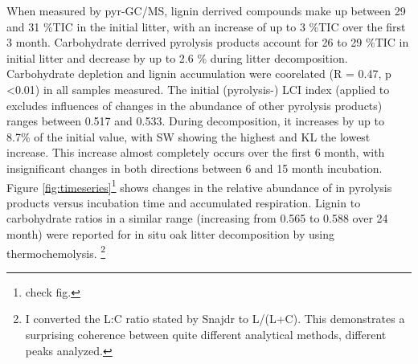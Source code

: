 \documentclass[10pt]{article}
\begin{document}
When measured by pyr-GC/MS, lignin derrived compounds make up between 29 and 31 \%TIC in the initial litter, with an increase of up to 3 \%TIC over the first 3 month. Carbohydrate derrived pyrolysis products account for 26 to 29 \%TIC in initial litter and decrease by up to 2.6 \% during litter decomposition. Carbohydrate depletion and lignin accumulation were coorelated (R = 0.47, p \textless 0.01) in all samples measured. The initial (pyrolysis-) LCI index (applied to excludes influences of changes in the abundance of other pyrolysis products) ranges between 0.517 and 0.533. During decomposition, it increases by up to 8.7\% of the initial value, with SW showing the highest and KL the lowest increase. This increase almost completely occurs over the first 6 month, with insignificant changes in both directions between 6 and 15 month incubation. Figure \ref{fig:timeseries}\footnote{check fig.} shows changes in the relative abundance of in pyrolysis products versus incubation time and accumulated respiration. Lignin to carbohydrate ratios in a similar range (increasing from 0.565 to 0.588 over 24 month) were reported for in situ oak litter decomposition by \cite{Snajdr2011} using thermochemolysis. \footnote{I converted the L:C ratio stated by Snajdr to L/(L+C). This demonstrates a surprising coherence between quite different analytical methods, different peaks analyzed.}


\end{document}
